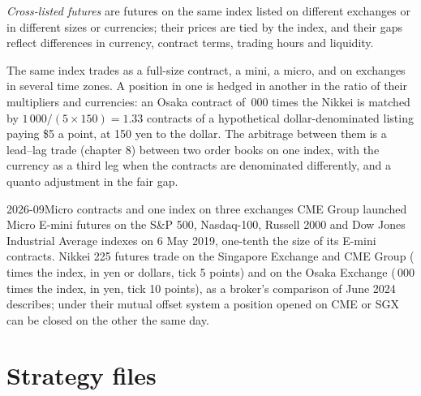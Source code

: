 \begin{definition}\label{def:hf:index-and-basket-arbitrage:cross}
\emph{Cross-listed futures} are futures on the same index listed on different exchanges or in different sizes or
currencies; their prices are tied by the index, and their gaps reflect differences in currency, contract terms, trading hours and liquidity.
\end{definition}

The same index trades as a full-size contract, a mini, a micro, and on exchanges in several time zones. A position in one is hedged in another in the
ratio of their multipliers and currencies: an Osaka contract of \,000 times the Nikkei is matched by $1\,000/(5\times150)=1.33$ contracts of a
hypothetical dollar-denominated listing paying \$5 a point, at 150 yen to the dollar. The arbitrage between them is a lead--lag trade (chapter 8) between two order books on
one index, with the currency as a third leg when the contracts are denominated differently, and a quanto adjustment in the fair gap.

\begin{dated}{2026-09}{Micro contracts and one index on three exchanges}\label{dat:hf:index-and-basket-arbitrage:listings}
CME Group launched Micro E-mini futures on the S\&P 500, Nasdaq-100, Russell 2000 and Dow Jones Industrial Average indexes on 6 May 2019, one-tenth
the size of its E-mini contracts. Nikkei 225 futures trade on the Singapore Exchange and CME Group ( times the index, in yen or dollars,
tick 5 points) and on the Osaka Exchange (\,000 times the index, in yen, tick 10 points), as a broker's comparison of June 2024 describes;
under their mutual offset system a position opened on CME or SGX can be closed on the other the same day.
\end{dated}

\section{Strategy files}

